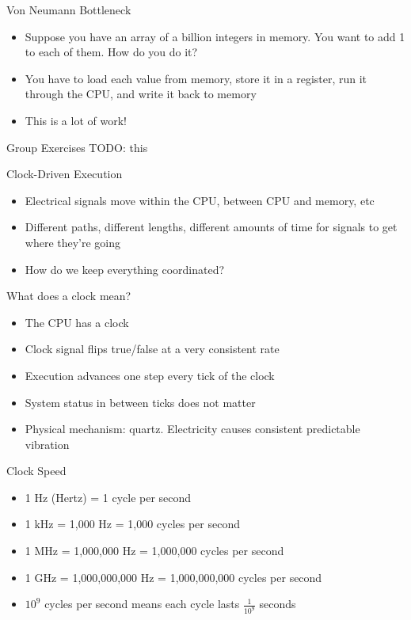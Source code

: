 \begin{frame}{Von Neumann Bottleneck}
	\begin{itemize}
		\item Suppose you have an array of a billion integers in memory. You want to add 1 to each of them. How do you do it?
		\item You have to load each value from memory, store it in a register, run it through the CPU, and write it back to memory
		\item This is a lot of work!
	\end{itemize}
\end{frame}

\begin{frame}{Group Exercises}
	TODO: this
\end{frame}


\begin{frame}{Clock-Driven Execution}
	\begin{itemize}
		\item Electrical signals move within the CPU, between CPU and memory, etc
		\item Different paths, different lengths, different amounts of time for signals to get where they're going
		\item How do we keep everything coordinated?
	\end{itemize}
\end{frame}

\begin{frame}{What does a clock mean?}
	\begin{itemize}
		\item The CPU has a clock
		\item Clock signal flips true/false at a very consistent rate
		\item Execution advances one step every tick of the clock
		\item System status in between ticks does not matter
		\item Physical mechanism: quartz. Electricity causes consistent predictable vibration
	\end{itemize}
\end{frame}

\begin{frame}{Clock Speed}
	\begin{itemize}
		\item 1 Hz (Hertz) = 1 cycle per second
		\item 1 kHz = 1,000 Hz = 1,000 cycles per second
		\item 1 MHz = 1,000,000 Hz = 1,000,000 cycles per second
		\item 1 GHz = 1,000,000,000 Hz = 1,000,000,000 cycles per second
		\item $10^9$ cycles per second means each cycle lasts $\frac{1}{10^9}$ seconds
	\end{itemize}
\end{frame}

